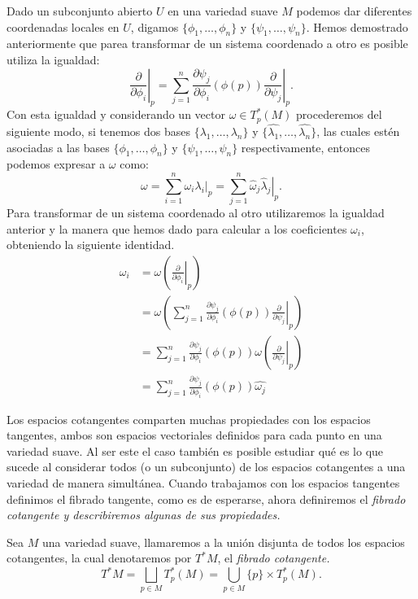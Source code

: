 Dado un subconjunto abierto $U$ en una variedad suave $M$ podemos dar diferentes coordenadas locales en $U$, digamos $\{\phi_1,\ldots,\phi_n\}$ y $\{\psi_1,\ldots,\psi_n\}$. Hemos demostrado anteriormente que parea transformar de un sistema coordenado a otro es posible utiliza la igualdad:
\[
	\left. \frac{\partial}{\partial \phi_i} \right|_p =
	\sum_{j=1}^{n} \left. \frac{\partial \psi_j}{\partial \phi_i} (\phi(p))
	\frac{\partial}{\partial \psi_j} \right|_{p}.
\]
Con esta igualdad y considerando un vector $\omega \in T_{p}^{*}(M)$ procederemos del siguiente modo, si tenemos dos bases $\{\lambda_1,\ldots,\lambda_n\}$ y $\{\hat{\lambda_1},\ldots,\hat{\lambda_n}\}$, las cuales estén asociadas a las bases $\{\phi_1, \ldots, \phi_n\}$ y $\{\psi_1, \ldots, \psi_n\}$ respectivamente, entonces podemos expresar a $\omega$ como:
\[
	\omega = \sum_{i=1}^{n} \left. \omega_i \lambda_i \right|_p
	= \sum_{j=1}^{n} \left. \hat{\omega}_j \hat{\lambda}_j \right|_p.
\]
Para transformar de un sistema coordenado al otro utilizaremos la igualdad anterior y la manera que hemos dado para calcular a los coeficientes $\omega_i$, obteniendo la siguiente identidad.
\begin{align*}
	\omega_i & = \omega
	\left(
	\left. \frac{\partial}{\partial \phi_i} \right|_{p}
	\right)                                                                       \\
	         & = \omega
	\left(
	\sum_{j=1}^{n} \frac{\partial \psi_j}{\partial \phi_i} (\phi(p))
	\left. \frac{\partial}{\partial \psi_j}\right|_{p} \right)                    \\
	         & = \sum_{j=1}^{n} \frac{\partial \psi_j}{\partial \phi_i} (\phi(p))
	\omega \left( \left. \frac{\partial}{\partial \psi_j}\right|_{p} \right)      \\
	         & = \sum_{j=1}^{n} \frac{\partial \psi_j}{\partial \phi_i} (\phi(p))
	\hat{\omega_j}
\end{align*}

Los espacios cotangentes comparten muchas propiedades con los espacios tangentes, ambos son espacios vectoriales definidos para cada punto en una variedad suave. Al ser este el caso también es posible estudiar qué es lo que sucede al considerar todos (o un subconjunto) de los espacios cotangentes a una variedad de manera simultánea. Cuando trabajamos con los espacios tangentes definimos el fibrado tangente, como es de esperarse, ahora definiremos el \it{fibrado cotangente} y describiremos algunas de sus propiedades.

\begin{definition}
	Sea $M$ una variedad suave, llamaremos a la unión disjunta de todos los espacios cotangentes, la cual denotaremos por $T^{*}M$, el \it{fibrado cotangente}.
	\[ T^{*}M = \bigsqcup_{p \in M} T_{p}^{*}(M) = \bigcup_{p \in M} \{p\} \times T_{p}^{*}(M). \]
\end{definition}


